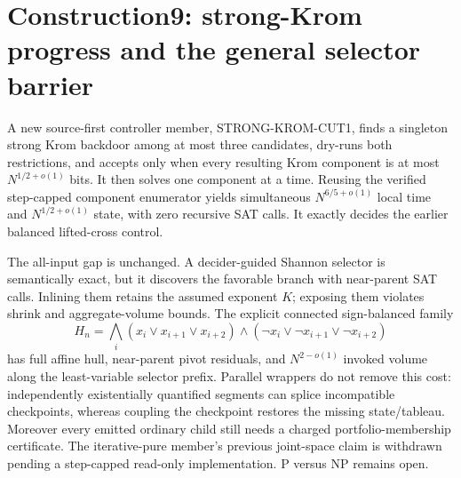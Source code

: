 \section{Construction9: strong-Krom progress and the general selector barrier}
\label{sec:construction9-main5}

A new source-first controller member, \textsc{STRONG-KROM-CUT1}, finds a
singleton strong Krom backdoor among at most three candidates, dry-runs both
restrictions, and accepts only when every resulting Krom component is at
most $N^{1/2+o(1)}$ bits.  It then solves one component at a time.  Reusing
the verified step-capped component enumerator yields simultaneous
$N^{6/5+o(1)}$ local time and $N^{1/2+o(1)}$ state, with zero recursive SAT
calls.  It exactly decides the earlier balanced lifted-cross control.

The all-input gap is unchanged.  A decider-guided Shannon selector is
semantically exact, but it discovers the favorable branch with near-parent
SAT calls.  Inlining them retains the assumed exponent $K$; exposing them
violates shrink and aggregate-volume bounds.  The explicit connected
sign-balanced family
\[
 H_n=\bigwedge_i(x_i\vee x_{i+1}\vee x_{i+2})\wedge
 (\neg x_i\vee\neg x_{i+1}\vee\neg x_{i+2})
\]
has full affine hull, near-parent pivot residuals, and
$N^{2-o(1)}$ invoked volume along the least-variable selector prefix.
Parallel wrappers do not remove this cost: independently existentially
quantified segments can splice incompatible checkpoints, whereas coupling
the checkpoint restores the missing state/tableau.  Moreover every emitted
ordinary child still needs a charged portfolio-membership certificate.
The iterative-pure member's previous joint-space claim is withdrawn pending
a step-capped read-only implementation.  P versus NP remains open.
